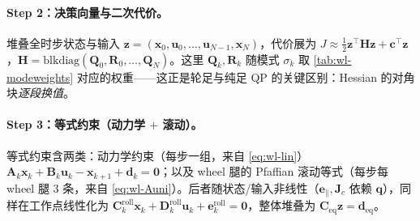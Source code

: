 \paragraph{Step 2：决策向量与二次代价。}
堆叠全时步状态与输入 $\mathbf{z}=(\mathbf{x}_0,\mathbf{u}_0,\dots,\mathbf{u}_{N-1},\mathbf{x}_N)$，代价展为 $J\approx\tfrac12\mathbf{z}^\top\mathbf{H}\mathbf{z}+\mathbf{c}^\top\mathbf{z}$，$\mathbf{H}=\mathrm{blkdiag}(\mathbf{Q}_0,\mathbf{R}_0,\dots,\mathbf{Q}_N)$。这里 $\mathbf{Q}_k,\mathbf{R}_k$ 随模式 $\sigma_k$ 取 \cref{tab:wl-modeweights} 对应的权重——这正是轮足与纯足 QP 的关键区别：Hessian 的对角块\emph{逐段换值}。

\paragraph{Step 3：等式约束（动力学 $+$ 滚动）。}
等式约束含两类：动力学约束（每步一组，来自 \cref{eq:wl-lin}）$\mathbf{A}_k\mathbf{x}_k+\mathbf{B}_k\mathbf{u}_k-\mathbf{x}_{k+1}+\mathbf{d}_k=\mathbf{0}$；以及 wheel 腿的 Pfaffian 滚动等式（每步每 wheel 腿 $3$ 条，来自 \cref{eq:wl-Auni}）。后者随状态/输入非线性（$\mathbf{e}_\parallel,\mathbf{J}_c$ 依赖 $\mathbf{q}$），同样在工作点线性化为 $\mathbf{C}_k^{\mathrm{roll}}\mathbf{x}_k+\mathbf{D}_k^{\mathrm{roll}}\mathbf{u}_k+\mathbf{e}_k^{\mathrm{roll}}=\mathbf{0}$，整体堆叠为 $\mathbf{C}_{\mathrm{eq}}\mathbf{z}=\mathbf{d}_{\mathrm{eq}}$。

